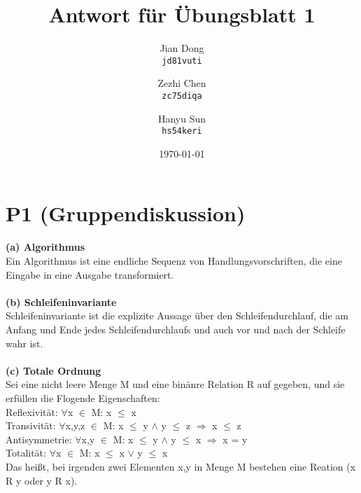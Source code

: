 \documentclass[a4paper,12pt]{article}
\begin{document}
\title{Antwort für Übungsblatt 1}
\author{
  Jian Dong\\
  \texttt{jd81vuti}
  \and
  Zezhi Chen\\
  \texttt{zc75diqa}
  \and
  Hanyu Sun\\
  \texttt{hs54keri}
}
\date{\today}
\maketitle

\section{P1 (Gruppendiskussion)}
\textbf{(a) Algorithmus} \\
Ein Algorithmus ist eine endliche Sequenz von Handlungsvorschriften, die eine Eingabe in eine Ausgabe transformiert. \\
\\
\textbf{(b) Schleifeninvariante} \\
Schleifeninvariante ist die explizite Aussage über den Schleifendurchlauf, die am Anfang und Ende jedes Schleifendurchlaufs und auch vor und nach der Schleife wahr ist. \\
\\
\textbf{(c) Totale Ordnung} \\
Sei eine nicht leere Menge M und eine binänre Relation R auf gegeben, und sie erfüllen die Flogende Eigenschaften:\\
Reflexivität: $\forall$x $\in$ M: x $\leq$ x\\
Transivität: $\forall$x,y,z $\in$ M: x $\leq$ y $\wedge$ y $\leq$ z $\Rightarrow$ x $\leq$ z\\
Antisymmetrie: $\forall$x,y $\in$ M: x $\leq$ y $\wedge$ y $\leq$ x $\Rightarrow$ x = y\\
Totalität: $\forall$x $\in$ M: x $\leq$ x $\vee$ y $\leq$ x\\
Das heißt, bei irgenden zwei Elementen x,y in Menge M bestehen eine Reation (x R y oder y R x). 
\end{document}
